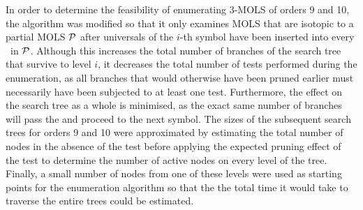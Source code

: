 In order to determine the feasibility of enumerating   $3$-MOLS of orders 9 and 10, the algorithm was modified so that it only examines MOLS that are isotopic to a partial MOLS $\mathcal{P}$ after universals of the $i$-th symbol have been inserted into every \lat \ in $\mathcal{P}$. Although this increases the total number of branches of the search tree that survive  to level $i$, it decreases the total number of \iis tests performed during the enumeration, as all branches that would otherwise have been pruned earlier must necessarily have been subjected to at least one \iis test. Furthermore, the effect on the search tree as a whole is minimised, as the exact same number of branches will pass the \iis and proceed to the next symbol. The sizes of the subsequent search trees for orders 9 and 10 were approximated by estimating the total number of nodes in the absence of the \iis test before applying the expected pruning effect of the \iis test to determine the number of active nodes on every level of the tree. Finally, a small number of nodes from one of these levels were used as starting points for the enumeration algorithm so that the the total time it would take to traverse the entire trees could be estimated.
